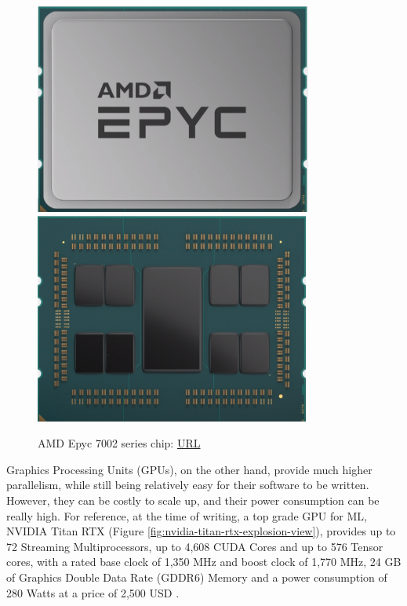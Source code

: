 \begin{figure} [h]
	\centering
	\includegraphics[scale=0.45]{Images/Hardware/amd-epyc.png}
	\includegraphics[scale=0.45]{Images/Hardware/amd-epyc-dies.png}
	\decoRule
	\caption[AMD Epyc 7002 series chip]{AMD Epyc 7002 series chip: \href{https://www.amd.com/en/processors/epyc-7002-series}{URL}}
	\label{fig:amd-epyc-7002-chip}
\end{figure}

Graphics Processing Units (GPUs), on the other hand, provide much higher parallelism, while still being relatively easy for their software to be written. However, they can be costly to scale up, and their power consumption can be really high. For reference, at the time of writing, a top grade GPU for ML, NVIDIA Titan RTX (Figure \ref{fig:nvidia-titan-rtx-explosion-view}), provides up to 72 Streaming Multiprocessors, up to 4,608 CUDA Cores and up to 576 Tensor cores, with a rated base clock of 1,350 MHz and boost clock of 1,770 MHz, 24 GB of Graphics Double Data Rate (GDDR6) Memory and a power consumption of 280 Watts at a price of 2,500 USD \cite{NVIDIA-Titan-RTX-GPU}.

